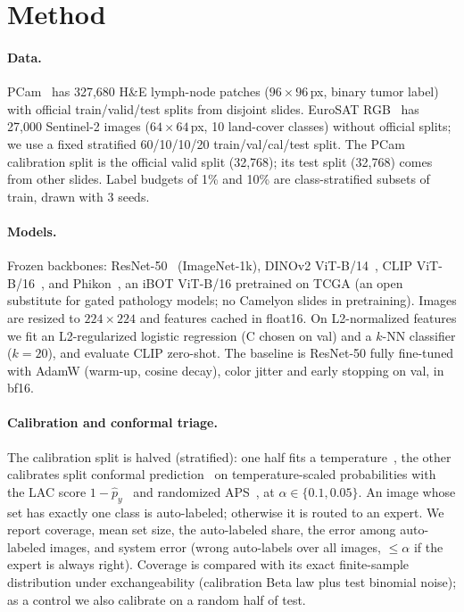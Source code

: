\documentclass[10pt,twocolumn]{article}
\begin{document}
\section{Method}
\paragraph{Data.} PCam~\cite{veeling2018} has 327,680 H\&E lymph-node patches
($96\times96$\,px, binary tumor label) with official train/valid/test splits from disjoint
slides. EuroSAT RGB~\cite{helber2019} has 27,000 Sentinel-2 images ($64\times64$\,px, 10
land-cover classes) without official splits; we use a fixed stratified 60/10/10/20
train/val/cal/test split. The PCam calibration split is the official valid split (32,768); its
test split (32,768) comes from other slides. Label budgets of 1\% and 10\% are class-stratified
subsets of train, drawn with 3 seeds.

\paragraph{Models.} Frozen backbones: ResNet-50~\cite{he2016} (ImageNet-1k), DINOv2
ViT-B/14~\cite{oquab2023}, CLIP ViT-B/16~\cite{radford2021}, and Phikon~\cite{filiot2023}, an
iBOT ViT-B/16 pretrained on TCGA (an open substitute for gated pathology models; no Camelyon
slides in pretraining). Images are resized to $224\times224$ and features cached in float16. On
L2-normalized features we fit an L2-regularized logistic regression (C chosen on val) and a
$k$-NN classifier ($k=20$), and evaluate CLIP zero-shot. The baseline is ResNet-50 fully
fine-tuned with AdamW (warm-up, cosine decay), color jitter and early stopping on val, in bf16.

\paragraph{Calibration and conformal triage.} The calibration split is halved (stratified):
one half fits a temperature~\cite{guo2017}, the other calibrates split conformal
prediction~\cite{vovk2005,angelopoulos2021} on temperature-scaled probabilities with the LAC
score $1-\hat p_y$~\cite{sadinle2019} and randomized APS~\cite{romano2020}, at
$\alpha\in\{0.1,0.05\}$. An image whose set has exactly one class is auto-labeled; otherwise it
is routed to an expert. We report coverage, mean set size, the auto-labeled share, the error
among auto-labeled images, and system error (wrong auto-labels over all images, $\le\alpha$ if
the expert is always right). Coverage is compared with its exact finite-sample distribution
under exchangeability (calibration Beta law plus test binomial noise); as a control we also
calibrate on a random half of test.
\end{document}
